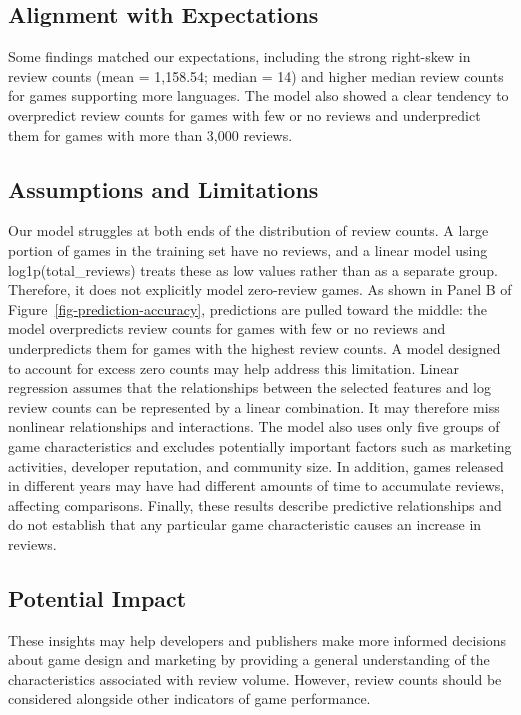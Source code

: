 \documentclass[
  letterpaper,
  DIV=11,
  numbers=noendperiod]{scrartcl}
\begin{document}
\subsection{Alignment with
Expectations}\label{alignment-with-expectations}

Some findings matched our expectations, including the strong right-skew
in review counts (mean = 1,158.54; median = 14) and higher median review
counts for games supporting more languages. The model also showed a
clear tendency to overpredict review counts for games with few or no
reviews and underpredict them for games with more than 3,000 reviews.

\subsection{Assumptions and
Limitations}\label{assumptions-and-limitations}

Our model struggles at both ends of the distribution of review counts. A
large portion of games in the training set have no reviews, and a linear
model using log1p(total\_reviews) treats these as low values rather than
as a separate group. Therefore, it does not explicitly model zero-review
games. As shown in Panel B of Figure~\ref{fig-prediction-accuracy},
predictions are pulled toward the middle: the model overpredicts review
counts for games with few or no reviews and underpredicts them for games
with the highest review counts. A model designed to account for excess
zero counts may help address this limitation. Linear regression assumes
that the relationships between the selected features and log review
counts can be represented by a linear combination. It may therefore miss
nonlinear relationships and interactions. The model also uses only five
groups of game characteristics and excludes potentially important
factors such as marketing activities, developer reputation, and
community size. In addition, games released in different years may have
had different amounts of time to accumulate reviews, affecting
comparisons. Finally, these results describe predictive relationships
and do not establish that any particular game characteristic causes an
increase in reviews.

\subsection{Potential Impact}\label{potential-impact}

These insights may help developers and publishers make more informed
decisions about game design and marketing by providing a general
understanding of the characteristics associated with review volume.
However, review counts should be considered alongside other indicators
of game performance.
\end{document}
